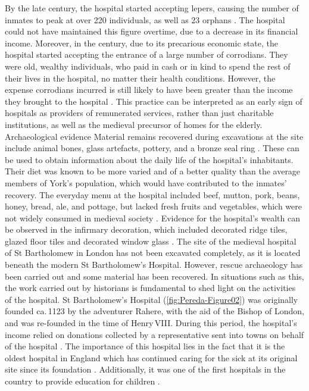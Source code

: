 \documentclass[%
	]{ijsra}
\renewcommand\AD{\xspace}
\begin{document}
By the late  century\AD, the hospital started accepting lepers, causing the number of inmates to peak at over \num{220} individuals, as well as 23 orphans \parencites[6,10]{Cullum_1991}[151]{Palliser_2014}. The hospital could not have maintained this figure overtime, due to a decrease in its financial income. 
Moreover, in the  century\AD, due to its precarious economic state, the hospital started accepting the entrance of a large number of corrodians. They were old, wealthy individuals, who paid in cash or in kind to spend the rest of their lives in the hospital, no matter their health conditions. 
However, the expense corrodians incurred is still likely to have been greater than the income they brought to the hospital \parencites[235]{Brodman_2009}[6]{Cullum_1991}. This practice can be interpreted as an early sign of hospitals as providers of remunerated services, rather than just charitable institutions, as well as the medieval precursor of homes for the elderly.
Archaeological evidence
Material remains recovered during excavations at the site include animal bones, glass artefacts, pottery, and a bronze seal ring \parencite{Johnson_2014}. These can be used to obtain information about the daily life of the hospital’s inhabitants. Their diet was known to be more varied and of a better quality than the average members of York’s population, which would have contributed to the inmates’ recovery. 
The everyday menu at the hospital included beef, mutton, pork, beans, honey, bread, ale, and pottage, but lacked fresh fruits and vegetables, which were not widely consumed in medieval society \parencites[16-17]{Cullum_1991}[19]{Cullum_1999}. 
Evidence for the hospital’s wealth can be observed in the infirmary decoration, which included decorated ridge tiles, glazed floor tiles and decorated window glass \parencite[101]{Dean_2008}. 
\IJSRAseparator
The site of the medieval hospital of St Bartholomew in London has not been excavated completely, as it is located beneath the modern St Bartholomew’s Hospital. However, rescue archaeology has been carried out and some material has been recovered.
In situations such as this, the work carried out by historians is fundamental to shed light on the activities of the hospital. St Bartholomew’s Hospital (\cref{fig:Pereda-Figure02}) %
was originally founded ca.\,1123 by the adventurer Rahere, with the aid of the Bishop of London, and was re-founded in the time of Henry\,VIII. During this period, the hospital’s income relied on donations collected by a representative sent into towns on behalf of the hospital \parencite[19,42]{Dainton_1961}. 
The importance of this hospital lies in the fact that it is the oldest hospital in England which has continued caring for the sick at its original site since its foundation \parencite[35]{Dainton_1961}. 
Additionally, it was one of the first hospitals in the country to provide education for children \parencite[21]{Rawcliffe_1999}. 
\end{document}
